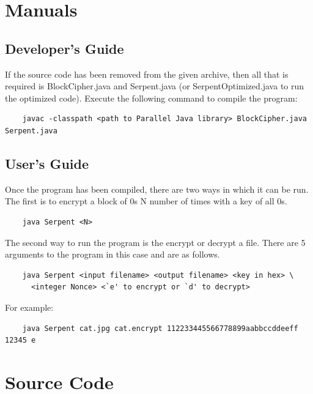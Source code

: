\documentclass[12pt]{article} %
\begin{document}
\section{Manuals}
\subsection{Developer's Guide}
  If the source code has been removed from the given archive, then all that is required is BlockCipher.java and Serpent.java (or SerpentOptimized.java to run the optimized code).  Execute the following command to compile the program:
  \begin{verbatim}
  	javac -classpath <path to Parallel Java library> BlockCipher.java Serpent.java
  \end{verbatim}
  
\subsection{User's Guide}
  Once the program has been compiled, there are two ways in which it can be run.  The first is to encrypt a block of 0s N number of times with a key of all 0s.
  \begin{verbatim}
  	java Serpent <N>
  \end{verbatim}
  The second way to run the program is the encrypt or decrypt a file.  There are 5 arguments to the program in this case and are as follows.
  \begin{verbatim}
  	java Serpent <input filename> <output filename> <key in hex> \
  	  <integer Nonce> <`e' to encrypt or `d' to decrypt>
  \end{verbatim}
  For example:
  \begin{verbatim}
  	java Serpent cat.jpg cat.encrypt 112233445566778899aabbccddeeff 12345 e
  \end{verbatim}

\section{Source Code}
\end{document}
